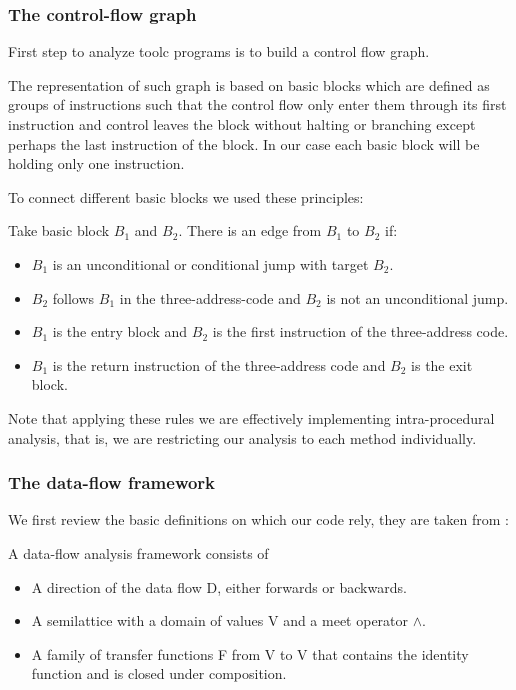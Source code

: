 \subsubsection{The control-flow graph}

First step to analyze toolc programs is to build a control flow graph.

The representation of such graph is based on basic blocks which are defined as groups of instructions such that the control flow only enter them through its first instruction and control leaves the block without halting or branching except perhaps the last instruction of the block. In our case each basic block will be holding only one instruction. 

To connect different basic blocks we used these principles:

Take basic block $B_1$ and $B_2$. There is an edge from $B_1$ to $B_2$ if:

\begin{itemize}
\item $B_1$ is an unconditional or conditional jump with target $B_2$.
\item $B_2$ follows $B_1$ in the three-address-code and $B_2$ is not an unconditional jump.
\item $B_1$ is the entry block and $B_2$ is the first instruction of the three-address code.
\item $B_1$ is the return instruction of the three-address code and $B_2$ is the exit block. 
\end{itemize}

Note that applying these rules we are effectively implementing intra-procedural analysis, that is, we are restricting our analysis to each method individually.


\subsubsection{The data-flow framework}

We first review the basic definitions on which our code rely, they are taken from \cite{DragonBook}:

\begin{definition}
A data-flow analysis framework consists of
\begin{itemize}
\item A direction of the data flow  D, either forwards or backwards.
\item A semilattice with a domain of values V and a meet operator $\land$. 
\item A family of transfer functions F from V to V that contains the identity function and is closed under composition. 
\end{itemize}
\end{definition}

